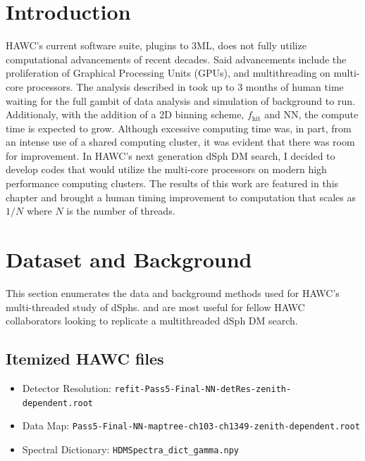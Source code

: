 \section{Introduction}\label{sec:mtd_intro}

HAWC's current software suite, plugins to 3ML, does not fully utilize computational advancements of recent decades.
Said advancements include the proliferation of Graphical Processing Units (GPUs), and multithreading on multi-core processors.
The analysis described in  took up to 3 months of human time waiting for the full gambit of data analysis and simulation of background to run.
Additionaly, with the addition of a 2D binning scheme, $f_\mathrm{hit}$ and NN, the compute time is expected to grow.
Although excessive computing time was, in part, from an intense use of a shared computing cluster, it was evident that there was room for improvement.
In HAWC's next generation dSph DM search, I decided to develop codes that would utilize the multi-core processors on modern high performance computing clusters.
The results of this work are featured in this chapter and brought a human timing improvement to computation that scales as $1/N$ where $N$ is the number of threads.

\section{Dataset and Background}\label{sec:mtd_databgd}

This section enumerates the data and background methods used for HAWC's multi-threaded study of dSphs.
 and  are most useful for fellow HAWC collaborators looking to replicate a multithreaded dSph DM search.

\subsection{Itemized HAWC files}\label{sec:mtd_data}

\begin{itemize}
    \item Detector Resolution: \texttt{refit-Pass5-Final-NN-detRes-zenith-dependent.root}
    \item Data Map: \texttt{Pass5-Final-NN-maptree-ch103-ch1349-zenith-dependent.root}
    \item Spectral Dictionary: \texttt{HDMSpectra\_dict\_gamma.npy}
\end{itemize}

